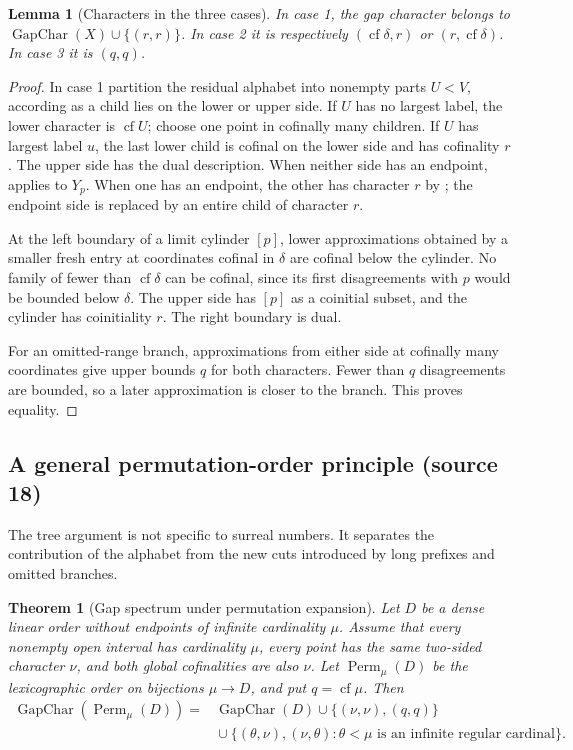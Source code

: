 \documentclass[11pt]{article}
\newtheorem{theorem}{Theorem}[section]
\newtheorem{lemma}[lemma]{Lemma}
\theoremstyle{definition}
\theoremstyle{remark}
\newcommand{\cf}{\operatorname{cf}}
\newcommand{\GapChar}{\operatorname{GapChar}}
\begin{document}
\begin{lemma}[Characters in the three cases]\label{swo:gs:lem:cut-characters}
In case 1, the gap character belongs to $\GapChar(X)\cup\{(r,r)\}$.
In case 2 it is respectively $(\cf\delta,r)$ or $(r,\cf\delta)$.
In case 3 it is $(q,q)$.
\end{lemma}
\begin{proof}
In case 1 partition the residual alphabet into nonempty parts $U<V$,
according as a child lies on the lower or upper side. If $U$ has no
largest label, the lower character is $\cf U$; choose one point in
cofinally many children. If $U$ has largest label $u$, the last lower
child is cofinal on the lower side and has cofinality $r$. The upper side
has the dual description. When neither side has an endpoint,
 applies to $Y_p$. When one has an endpoint,
the other has character $r$ by ; the
endpoint side is replaced by an entire child of character $r$.

At the left boundary of a limit cylinder $[p]$, lower approximations
obtained by a smaller fresh entry at coordinates cofinal in $\delta$ are
cofinal below the cylinder. No family of fewer than $\cf\delta$ can be
cofinal, since its first disagreements with $p$ would be bounded below
$\delta$. The upper side has $[p]$ as a coinitial subset, and the cylinder
has coinitiality $r$. The right boundary is dual.

For an omitted-range branch, approximations from either side at cofinally
many coordinates give upper bounds $q$ for both characters. Fewer than
$q$ disagreements are bounded, so a later approximation is closer to the
branch. This proves equality.
\end{proof}

\subsection{A general permutation-order principle (source 18)}
\label{swo:vi:sub:sh-general}

The tree argument is not specific to surreal numbers.  It separates
the contribution of the alphabet from the new cuts introduced by
long prefixes and omitted branches.

\begin{theorem}[Gap spectrum under permutation expansion]
\label{swo:sh:thm:general-permutation-gap-spectrum}
Let $D$ be a dense linear order without endpoints of infinite
cardinality $\mu$.  Assume that every nonempty open interval has
cardinality $\mu$, every point has the same two-sided character
$\nu$, and both global cofinalities are also $\nu$.  Let
$\operatorname{Perm}_\mu(D)$ be the lexicographic order on bijections
$\mu\to D$, and put $q=\operatorname{cf}\mu$.  Then
\[
\begin{aligned}
\GapChar(\operatorname{Perm}_\mu(D))
={}&\GapChar(D)
 \cup\{(\nu,\nu),(q,q)\}\\
 &{}\cup\{(\theta,\nu),(\nu,\theta):
       \theta<\mu\text{ is an infinite regular cardinal}\}.
\end{aligned}
\]
\end{theorem}
\end{document}
